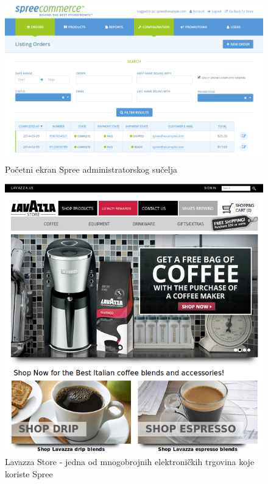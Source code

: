 \begin{figure}[H]
    \centering
    \includegraphics[scale=0.40]{pictures/spree_admin}
    \caption{Početni ekran Spree administratorskog sučelja}
    \label{pic:spree}
\end{figure}

\begin{figure}[H]
    \centering
    \includegraphics[scale=0.65]{pictures/spree_lavazza}
    \caption{Lavazza Store - jedna od mnogobrojnih elektroničkih trgovina koje koriste Spree}
    \label{pic:spreeLavazza}
\end{figure}


